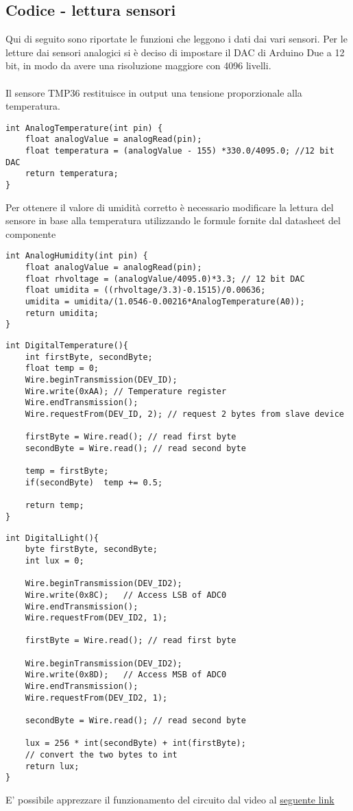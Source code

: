 \subsection{Codice - lettura sensori}
Qui di seguito sono riportate le funzioni che leggono i dati dai vari sensori. Per le letture dai sensori analogici si è deciso di impostare il DAC di Arduino Due a 12 bit, in modo da avere una risoluzione maggiore con 4096 livelli.\\\\
Il sensore TMP36 restituisce in output una tensione proporzionale alla temperatura.
\begin{lstlisting}[frame=single, language=Arduino, caption = Lettura dal sensore TMP36, label = lst:AnalogTemp]
int AnalogTemperature(int pin) {
    float analogValue = analogRead(pin);
    float temperatura = (analogValue - 155) *330.0/4095.0; //12 bit DAC
    return temperatura;
}
\end{lstlisting}
Per ottenere il valore di umidità corretto è necessario modificare la lettura del sensore in base alla temperatura utilizzando le formule fornite dal datasheet del componente
\begin{lstlisting}[frame=single, language=Arduino, caption = Lettura dal sensore HIH-5030, label = lst:AnalogHum]
int AnalogHumidity(int pin) {
    float analogValue = analogRead(pin);
    float rhvoltage = (analogValue/4095.0)*3.3; // 12 bit DAC
    float umidita = ((rhvoltage/3.3)-0.1515)/0.00636;
    umidita = umidita/(1.0546-0.00216*AnalogTemperature(A0));
    return umidita;
}
\end{lstlisting}
\begin{lstlisting}[frame=single, language=Arduino]
int DigitalTemperature(){
    int firstByte, secondByte;
    float temp = 0;
    Wire.beginTransmission(DEV_ID);
    Wire.write(0xAA); // Temperature register   
    Wire.endTransmission();
    Wire.requestFrom(DEV_ID, 2); // request 2 bytes from slave device

    firstByte = Wire.read(); // read first byte
    secondByte = Wire.read(); // read second byte

    temp = firstByte;
    if(secondByte)  temp += 0.5;

    return temp;
}
\end{lstlisting}
\begin{lstlisting}[frame=single, language=Arduino]
int DigitalLight(){
    byte firstByte, secondByte;
    int lux = 0;

    Wire.beginTransmission(DEV_ID2);
    Wire.write(0x8C);   // Access LSB of ADC0
    Wire.endTransmission();
    Wire.requestFrom(DEV_ID2, 1);

    firstByte = Wire.read(); // read first byte

    Wire.beginTransmission(DEV_ID2);
    Wire.write(0x8D);   // Access MSB of ADC0
    Wire.endTransmission();
    Wire.requestFrom(DEV_ID2, 1);

    secondByte = Wire.read(); // read second byte

    lux = 256 * int(secondByte) + int(firstByte); 
    // convert the two bytes to int
    return lux;
}
\end{lstlisting}
E' possibile apprezzare il funzionamento del circuito dal video al \href{https://mediaspace.unipd.it/media/Esperimento+2/1_o92nu58e}{seguente link}